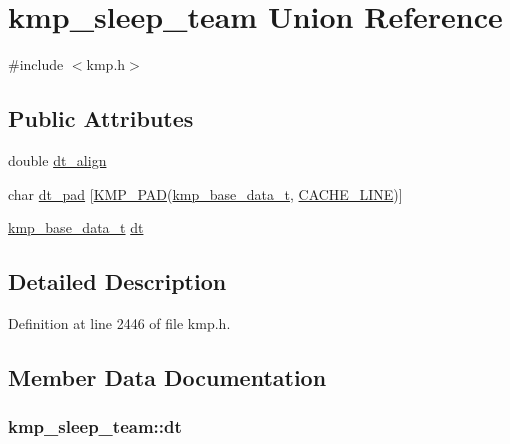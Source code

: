 \hypertarget{unionkmp__sleep__team}{\section{kmp\-\_\-sleep\-\_\-team Union Reference}
\label{unionkmp__sleep__team}
}


{\ttfamily \#include $<$kmp.\-h$>$}

\subsection*{Public Attributes}
\begin{DoxyCompactItemize}
\item 
double \hyperlink{unionkmp__sleep__team_ad34e877662b70f6d5aad13b5b6017be6}{dt\-\_\-align}
\item 
char \hyperlink{unionkmp__sleep__team_abbdb5b123a4f5b5eff4f55983ad1fa43}{dt\-\_\-pad} \mbox{[}\hyperlink{kmp__lock_8h_a7e782410115489f45ab1686c39a2bb89}{K\-M\-P\-\_\-\-P\-A\-D}(\hyperlink{kmp_8h_a70eaeca396fffda9b8844afc81efa073}{kmp\-\_\-base\-\_\-data\-\_\-t}, \hyperlink{kmp__os_8h_a86194c659a2d795e5f5949d293ae4661}{C\-A\-C\-H\-E\-\_\-\-L\-I\-N\-E})\mbox{]}
\item 
\hyperlink{kmp_8h_a70eaeca396fffda9b8844afc81efa073}{kmp\-\_\-base\-\_\-data\-\_\-t} \hyperlink{unionkmp__sleep__team_a716ad24bf33f37360e7c4d9bc0b36816}{dt}
\end{DoxyCompactItemize}


\subsection{Detailed Description}


Definition at line 2446 of file kmp.\-h.



\subsection{Member Data Documentation}
\hypertarget{unionkmp__sleep__team_a716ad24bf33f37360e7c4d9bc0b36816}{
\subsubsection[{dt}]{ kmp\-\_\-sleep\-\_\-team\-::dt}}\label{unionkmp__sleep__team_a716ad24bf33f37360e7c4d9bc0b36816}


